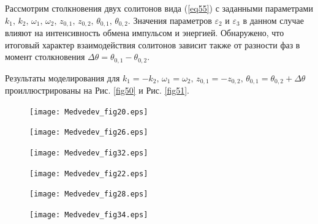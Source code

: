 \documentclass[12pt,a4paper]{article}
\begin{document}
	Рассмотрим столкновения двух солитонов вида (\ref{eq55}) с заданными параметрами \(k_{1},\,k_{2},\,\omega_{1},\,\omega_{2},\,z_{0,1},\,z_{0,2},\,\theta_{0,1},\,\theta_{0,2}\). Значения параметров \(\varepsilon_{2}\) и \(\varepsilon_{3}\) в данном случае влияют на интенсивность обмена импульсом и энергией. Обнаружено, что итоговый характер взаимодействия солитонов зависит также от разности фаз в момент столкновения \(\Delta \theta=\theta_{0,1}-\theta_{0,2}\).

	Результаты моделирования для \(k_{1}=-k_{2},\,\omega_{1}=\omega_{2},\,z_{0,1}=-z_{0,2},\,\theta_{0,1}=\theta_{0,2}+\Delta \theta\) проиллюстрированы на Рис. \ref{fig50} и Рис. \ref{fig51}.

	\begin{figure}[H]
		\begin{minipage}[h]{0.32\linewidth}
			\texttt{[image: Medvedev\_fig20.eps]}
		\end{minipage}
		\begin{minipage}[h]{0.32\linewidth}
			\texttt{[image: Medvedev\_fig26.eps]}
		\end{minipage}
		\begin{minipage}[h]{0.32\linewidth}
			\texttt{[image: Medvedev\_fig32.eps]}
		\end{minipage}

		\begin{minipage}[h]{0.32\linewidth}
			\texttt{[image: Medvedev\_fig22.eps]}
		\end{minipage}
		\begin{minipage}[h]{0.32\linewidth}
			\texttt{[image: Medvedev\_fig28.eps]}
		\end{minipage}
		\begin{minipage}[h]{0.32\linewidth}
			\texttt{[image: Medvedev\_fig34.eps]}
		\end{minipage}


\end{figure}
\end{document}
